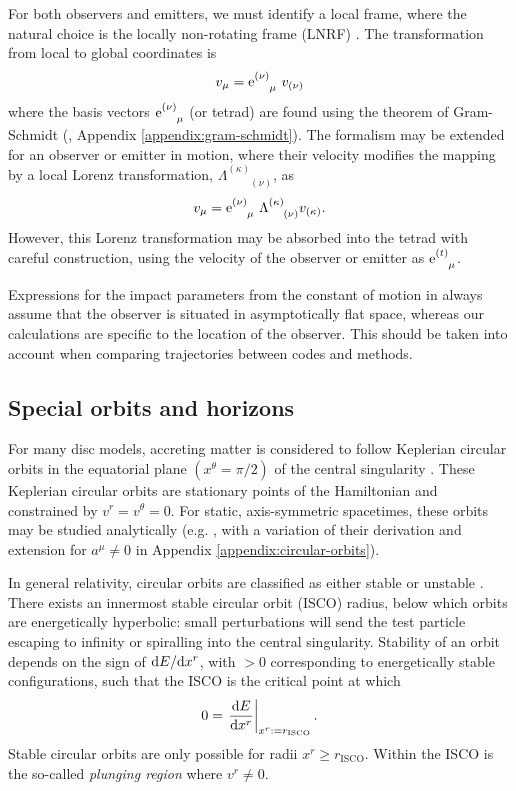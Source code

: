 For both observers and emitters, we must identify a local frame, where the natural choice is the locally non-rotating frame (LNRF) \citep{bardeen_rotating_1972} . The transformation from local to global coordinates is
\begin{equation}
    v_\mu = \text{e}^{(\nu)}_{\phantom{(\nu)}\mu}\  v_{(\nu)}
\end{equation}
where the basis vectors $\text{e}^{(\nu)}_{\phantom{(\nu)}\mu}$ (or tetrad) are found using the theorem of Gram-Schmidt (\cite{schmidt_uber_1989}, Appendix \ref{appendix:gram-schmidt}). The formalism may be extended for an observer or emitter in motion, where their velocity modifies the mapping by a local Lorenz transformation, $\Lambda^{(\kappa)}_{\phantom{(\kappa)}(\nu)}$, as 
\begin{equation}
    v_\mu = \text{e}^{(\nu)}_{\phantom{(\nu)}\mu}\  \Lambda^{(\kappa)}_{\phantom{(a)}(\nu)} v_{(\kappa)}.
\end{equation}
However, this Lorenz transformation may be absorbed into the tetrad with careful construction, using the velocity of the observer or emitter as $\utensor{\e}{(t)}{\mu}$.

Expressions for the impact parameters from the constant of motion in \cite{cunningham_optical_1973} always assume that the observer is situated in asymptotically flat space, whereas our calculations are specific to the location of the observer. This should be taken into account when comparing trajectories between codes and methods.

\subsection{Special orbits and horizons}

For many disc models, accreting matter is considered to follow Keplerian circular orbits in the equatorial plane $(x^\theta = \pi/2)$ of the central singularity \citep{shakura_black_1973}. These Keplerian circular orbits are stationary points of the Hamiltonian and constrained by $v^r = v^\theta = 0$. For static, axis-symmetric spacetimes, these orbits may be studied analytically (e.g. \cite{johannsen_regular_2013}, with a variation of their derivation and extension for $a^\mu \neq 0$ in Appendix \ref{appendix:circular-orbits}).

In general relativity, circular orbits are classified as either stable or unstable \citep{wilkins_bound_1972,bardeen_rotating_1972}. There exists an innermost stable circular orbit (ISCO) radius, below which orbits are energetically hyperbolic: small perturbations will send the test particle escaping to infinity or spiralling into the central singularity.  Stability of an orbit depends on the sign of $\text{d} E / \text{d} x^r$, with $>0$ corresponding to energetically stable configurations, such that the ISCO is the critical point at which 
\begin{equation}
    \label{eq:isco-definition}
    0 = \left. \frac{\text{d} E}{\text{d} x^r} \right\rvert_{x^r := r_\text{ISCO}}.
\end{equation}
Stable circular orbits are only possible for radii $x^r \geq r_\text{ISCO}$. Within the ISCO is the so-called \textit{plunging region} where $v^r \neq 0$. 


